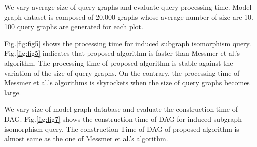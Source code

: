 We vary average size of query graphs and evaluate query processing time.
Model graph dataset is composed of 20,000 graphs whose average number of size are 10.
100 query graphs are generated for each plot.



Fig.\ref{fig:fig5} shows the processing time for induced subgraph isomorphism query.
Fig.\ref{fig:fig5} indicates that proposed algorithm is faster than Messmer et al.'s algorithm.
The processing time of proposed algorithm is stable against the variation of the size of query graphs.
On the contrary, the processing time of Messmer et al.'s algorithms is skyrockets when the size of query graphs becomes large.


%



We vary size of model graph database and evaluate the construction time of DAG.
Fig.\ref{fig:fig7} shows the construction time of DAG for induced subgraph isomorphism query.
The construction Time of DAG of proposed algorithm is almost same as the one of Messmer et al.'s algorithm.






